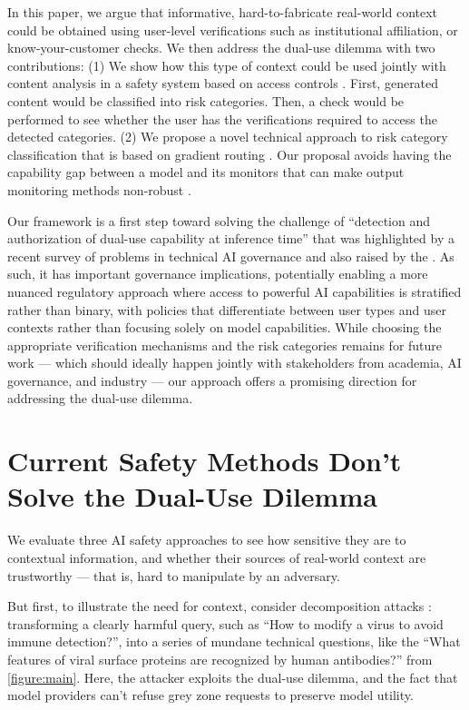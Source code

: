 \documentclass{article}
\theoremstyle{plain}
\theoremstyle{definition}
\theoremstyle{remark}
\begin{document}
In this paper, we argue that informative, hard-to-fabricate
real-world context could be obtained using user-level verifications
such as institutional affiliation, or know-your-customer checks. We
then address the dual-use dilemma with two contributions:
(1) We show how this type of context could be used jointly with
content analysis in a safety system based on access controls
\cite{butler1974}. First, generated content would be classified into
risk categories. Then, a check would be performed to see whether the
user has the verifications required to access the detected
categories. (2) We propose a novel technical approach to risk
category classification that is based on gradient routing
\cite{cloud2024gradientroutingmaskinggradients}. Our proposal avoids
having the capability gap between a model and its monitors that can
make output monitoring methods non-robust
\cite{jin2024jailbreakinglargelanguagemodels}.

Our framework is a first step toward solving the challenge of
``detection and authorization of dual-use capability at inference
time'' that was highlighted by a recent survey of problems in
technical AI governance \cite{reuel2025openproblemstechnicalai} and
also raised by the \citet{NIST_AI_800_1_ipd_2024}.
As such, it has important governance implications, potentially
enabling a more nuanced regulatory approach where access to powerful
AI capabilities is stratified rather than binary, with policies that
differentiate between user types and user contexts rather than
focusing solely on model capabilities. While choosing the appropriate
verification mechanisms and the risk categories remains for future
work --- which should ideally happen jointly with stakeholders from
academia, AI governance, and industry --- our approach offers a
promising direction for addressing the dual-use dilemma.

\section{Current Safety Methods Don't Solve the Dual-Use Dilemma}
\label{section:current-methods}

We evaluate three AI safety approaches to see how sensitive they are
to contextual information, and whether their sources of real-world
context are trustworthy --- that is, hard to manipulate by an adversary.

But first, to illustrate the need for context, consider decomposition
attacks \cite{glukhov2023llmcensorshipmachinelearning,
glukhov2024breachthousandleaksunsafe}: transforming a clearly harmful
query, such as ``How to modify a virus to avoid immune detection?'',
into a series of mundane technical questions, like the ``What
features of viral surface proteins are recognized by human
antibodies?'' from \cref{figure:main}. Here, the attacker exploits
the dual-use dilemma, and the fact that model providers can't refuse
grey zone requests to preserve model utility.
\end{document}
